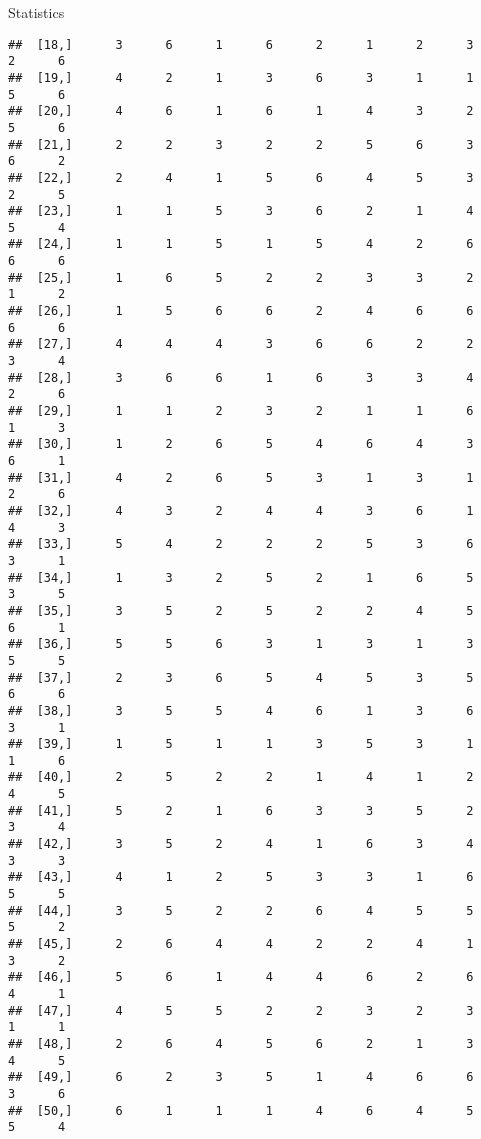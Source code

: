 \documentclass[
  ignorenonframetext,
]{beamer}
\begin{document}
\begin{frame}[fragile]{Statistics}
\begin{verbatim}
##  [18,]      3      6      1      6      2      1      2      3      2      6
##  [19,]      4      2      1      3      6      3      1      1      5      6
##  [20,]      4      6      1      6      1      4      3      2      5      6
##  [21,]      2      2      3      2      2      5      6      3      6      2
##  [22,]      2      4      1      5      6      4      5      3      2      5
##  [23,]      1      1      5      3      6      2      1      4      5      4
##  [24,]      1      1      5      1      5      4      2      6      6      6
##  [25,]      1      6      5      2      2      3      3      2      1      2
##  [26,]      1      5      6      6      2      4      6      6      6      6
##  [27,]      4      4      4      3      6      6      2      2      3      4
##  [28,]      3      6      6      1      6      3      3      4      2      6
##  [29,]      1      1      2      3      2      1      1      6      1      3
##  [30,]      1      2      6      5      4      6      4      3      6      1
##  [31,]      4      2      6      5      3      1      3      1      2      6
##  [32,]      4      3      2      4      4      3      6      1      4      3
##  [33,]      5      4      2      2      2      5      3      6      3      1
##  [34,]      1      3      2      5      2      1      6      5      3      5
##  [35,]      3      5      2      5      2      2      4      5      6      1
##  [36,]      5      5      6      3      1      3      1      3      5      5
##  [37,]      2      3      6      5      4      5      3      5      6      6
##  [38,]      3      5      5      4      6      1      3      6      3      1
##  [39,]      1      5      1      1      3      5      3      1      1      6
##  [40,]      2      5      2      2      1      4      1      2      4      5
##  [41,]      5      2      1      6      3      3      5      2      3      4
##  [42,]      3      5      2      4      1      6      3      4      3      3
##  [43,]      4      1      2      5      3      3      1      6      5      5
##  [44,]      3      5      2      2      6      4      5      5      5      2
##  [45,]      2      6      4      4      2      2      4      1      3      2
##  [46,]      5      6      1      4      4      6      2      6      4      1
##  [47,]      4      5      5      2      2      3      2      3      1      1
##  [48,]      2      6      4      5      6      2      1      3      4      5
##  [49,]      6      2      3      5      1      4      6      6      3      6
##  [50,]      6      1      1      1      4      6      4      5      5      4

\end{verbatim}
\end{frame}
\end{document}
